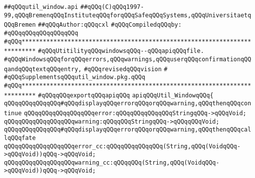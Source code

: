 \label{src/lib/tk/src/toolkit/util_window.api}
\verb|##qQQqutil_window.api|\newline
\verb|##qQQq(C)qQQq1997-99,qQQqBremenqQQqInstituteqQQqforqQQqSafeqQQqSystems,qQQqUniversitaetqQQqBremen|\newline
\verb|##qQQqAuthor:qQQqcxl|\newline
\newline
\verb|#qQQqCompiledqQQqby:|\newline
\verb|#qQQqqQQqqQQqqQQqqQQq|\newline
\newline
\newline
\newline
\verb|#qQQq**************************************************************************|\newline
\verb|#qQQqUtitilityqQQqwindowsqQQq--qQQqapiqQQqfile.|\newline
\verb|#qQQqWindowsqQQqforqQQqerrors,qQQqwarnings,qQQquserqQQqconfirmationqQQqandqQQqtextqQQqentry,|\newline
\verb|#qQQqrevisedqQQqvision|\newline
\verb|#|\newline
\verb|#qQQqSupplementsqQQqutil_window.pkg.qQQq|\newline
\verb|#qQQq**************************************************************************|\newline
\newline
\verb|#qQQqqQQqexportqQQqapiqQQq|\newline
\verb|apiqQQqUtil_WindowqQQq{|\newline
\newline
\verb|qQQqqQQqqQQqqQQq#qQQqdisplayqQQqerrorqQQqorqQQqwarning,qQQqthenqQQqcontinue|\newline
\verb|qQQqqQQqqQQqqQQqqQQqerror:qQQqqQQqqQQqqQQqStringqQQq->qQQqVoid;|\newline
\verb|qQQqqQQqqQQqqQQqqQQqwarning:qQQqqQQqStringqQQq->qQQqqQQqVoid;|\newline
\newline
\verb|qQQqqQQqqQQqqQQq#qQQqdisplayqQQqerrorqQQqorqQQqwarning,qQQqthenqQQqcallqQQqfate|\newline
\verb|qQQqqQQqqQQqqQQqqQQqerror_cc:qQQqqQQqqQQqqQQq(String,qQQq(VoidqQQq->qQQqVoid))qQQq->qQQqVoid;|\newline
\verb|qQQqqQQqqQQqqQQqqQQqwarning_cc:qQQqqQQq(String,qQQq(VoidqQQq->qQQqVoid))qQQq->qQQqVoid;|\newline
